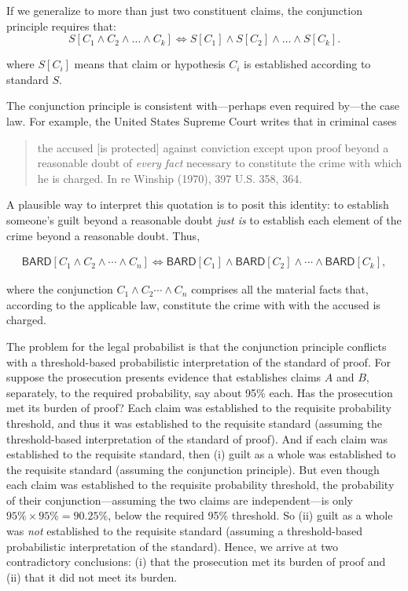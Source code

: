 \documentclass[10pt,dvipsnames,enabledeprecatedfontcommands]{scrartcl}
\newcommand{\et}{\wedge}
\begin{document}
\noindent
If we generalize to more than just two constituent claims, the
conjunction principle requires that:
\[S[C_1 \wedge C_2  \wedge \dots \wedge  C_k] \Leftrightarrow S[C_1] \wedge S[C_2]  \wedge \dots \wedge  S[C_k].\]

\noindent
where \(S[C_i]\) means that claim or hypothesis \(C_i\) is established
according to standard \(S\).

The conjunction principle is consistent with---perhaps even required
by---the case law. For example, the United States Supreme Court writes
that in criminal cases

\begin{quote}
the accused [is protected] against conviction except upon proof beyond a reasonable doubt of \textit{every fact} necessary to constitute the crime with which he is charged. In re Winship (1970), 397 U.S. 358, 364. 
\end{quote}

\noindent
A plausible way to interpret this quotation is to posit this identity:
to establish someone's guilt beyond a reasonable doubt \textit{just is}
to establish each element of the crime beyond a reasonable doubt. Thus,

\begin{align*}\mathsf{BARD}[C_1 \wedge C_2   \wedge \cdots \wedge C_n] \Leftrightarrow \mathsf{BARD}[C_1] \wedge \mathsf{BARD}[C_2]  \wedge \cdots \wedge \mathsf{BARD}[C_k],
\end{align*}

\noindent
where the conjunction \(C_1 \et C_2 \cdots \et C_n\) comprises all the
material facts that, according to the applicable law, constitute the
crime with with the accused is charged.

The problem for the legal probabilist is that the conjunction principle
conflicts with a threshold-based probabilistic interpretation of the
standard of proof. For suppose the prosecution presents evidence that
establishes claims \(A\) and \(B\), separately, to the required
probability, say about 95\% each. Has the prosecution met its burden of
proof? Each claim was established to the requisite probability
threshold, and thus it was established to the requisite standard
(assuming the threshold-based interpretation of the standard of proof).
And if each claim was established to the requisite standard, then (i)
guilt as a whole was established to the requisite standard (assuming the
conjunction principle). But even though each claim was established to
the requisite probability threshold, the probability of their
conjunction---assuming the two claims are independent---is only
\(95\%\times95\%=90.25\%\), below the required 95\% threshold. So (ii)
guilt as a whole was \textit{not} established to the requisite standard
(assuming a threshold-based probabilistic interpretation of the
standard). Hence, we arrive at two contradictory conclusions: (i) that
the prosecution met its burden of proof and (ii) that it did not meet
its burden.
\end{document}
